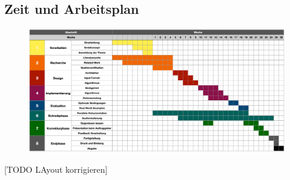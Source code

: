 \begin{landscape}

\chapter{Zeit und Arbeitsplan}

\begin{figure}
	\centering
	\includegraphics[trim=0 0 0 0, scale=0.3]{pics/Zeitplan}
\end{figure}

[TODO LAyout korrigieren]

\end{landscape}